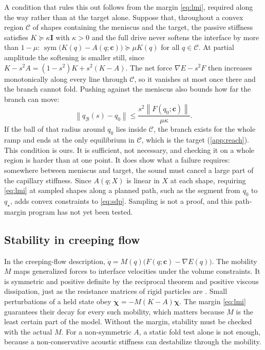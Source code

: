 \documentclass[11pt,a4paper]{article}
\numberwithin{equation}{section}
\newcommand{\Id}{\bm I}
\newcommand{\norm}[1]{\left\lVert#1\right\rVert}
\DeclareMathOperator{\sym}{sym}
\begin{document}
A condition that rules this out follows from the margin \cref{eq:lmi}, required
along the way rather than at the target alone. Suppose that, throughout a
convex region $\mathcal C$ of shapes containing the meniscus and the target, the
passive stiffness satisfies $K\succeq\kappa\Id$ with $\kappa>0$ and the full
drive never softens the interface by more than $1-\mu$:
$\sym\bigl(K(q)-A(q;\bm c)\bigr)\succeq\mu K(q)$ for all $q\in\mathcal C$. At
partial amplitude the softening is smaller still, since
$K-s^2A=(1-s^2)K+s^2(K-A)$. The net force $\nabla E-s^2F$ then increases
monotonically along every line through $\mathcal C$, so it vanishes at most once
there and the branch cannot fold. Pushing against the meniscus also bounds how
far the branch can move:
\begin{equation}
 \norm{q_{\mathcal B}(s)-q_0}\le\frac{s^2\norm{F(q_0;\bm c)}}{\mu\kappa}.
 \label{eq:reach-ball}
\end{equation}
If the ball of that radius around $q_0$ lies inside $\mathcal C$, the branch
exists for the whole ramp and ends at the only equilibrium in $\mathcal C$,
which is the target (\cref{app:reach}). This condition is ours. It is
sufficient, not necessary, and checking it on a whole region is harder than at
one point. It does show what a failure requires: somewhere between meniscus and
target, the sound must cancel a large part of the capillary stiffness. Since
$A(q;X)$ is linear in $X$ at each shape, requiring \cref{eq:lmi} at sampled
shapes along a planned path, such as the segment from $q_0$ to $q_\star$, adds
convex constraints to \cref{eq:sdp}. Sampling is not a proof, and this
path-margin program has not yet been tested.

\subsection{Stability in creeping flow}
In the creeping-flow description, $\dot q=M(q)\bigl(F(q;\bm c)-\nabla E(q)\bigr)$.
The mobility $M$ maps generalized forces to interface velocities under the
volume constraints. It is symmetric and positive definite by the reciprocal
theorem and positive viscous dissipation, just as the resistance matrices of
rigid particles are \cite{happel1983}. Small perturbations of a held state obey
$\dot{\bm\chi}=-M(K-A)\bm\chi$. The margin \cref{eq:lmi} guarantees their decay
for every such mobility, which matters because $M$ is the least certain part of
the model. Without the margin, stability must be checked with the actual $M$.
For a non-symmetric $A$, a static fold test alone is not enough, because a
non-conservative acoustic stiffness can destabilize through the mobility.
\end{document}
